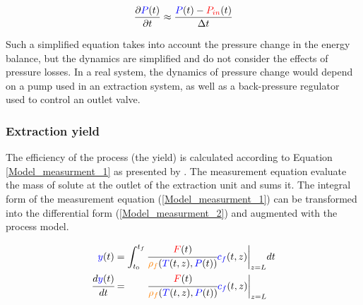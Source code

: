 \documentclass[../Article_Model_Parameters.tex]{subfiles}
\begin{document}
		{\footnotesize
			\begin{equation}
				\frac{\partial {\color{blue}P}(t)}{\partial t} \approx \frac{{\color{blue}P}(t) - {\color{red}P_{in}}(t) }{\Delta t}
		\end{equation}}
		
		Such a simplified equation takes into account the pressure change in the energy balance, but the dynamics are simplified and do not consider the effects of pressure losses. In a real system, the dynamics of pressure change would depend on a pump used in an extraction system, as well as a back-pressure regulator used to control an outlet valve.
  
		\subsubsection{Extraction yield} \label{CH: Yield}
			
		The efficiency of the process (the yield) is calculated according to Equation \ref{Model_measurment_1} as presented by \citet{Sovova1994a}. The measurement equation evaluate the mass of solute at the outlet of the extraction unit and sums it. The integral form of the measurement equation (\ref{Model_measurment_1}) can be transformed into the differential form (\ref{Model_measurment_2}) and augmented with the process model.
			
		{\footnotesize
			\begin{align} 
				\label{Model_measurment_1}
				{\color{blue}y}(t) &= \int_{t_0}^{t_f} \cfrac{{\color{red}F}(t)}{{\color{orange}\rho_f}({\color{blue}T}(t,z),{\color{blue}P}(t))} {\color{blue}c_f}(t,z) \biggr\rvert_{z=L} dt \\
				\cfrac{d{\color{blue}y}(t)}{dt} &= \qquad \cfrac{{\color{red}F}(t)}{{\color{orange}\rho_f}({\color{blue}T}(t,z),{\color{blue}P}(t))} {\color{blue}c_f}(t,z) \biggr\rvert_{z=L} 
                \label{Model_measurment_2}
		\end{align}	}
  
\end{document}

